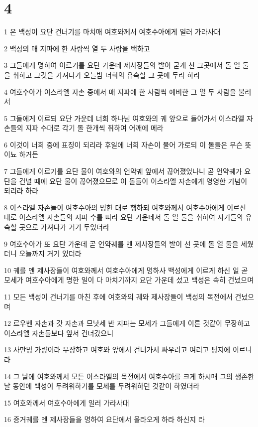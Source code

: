 \chapter{4}

\par 1 온 백성이 요단 건너기를 마치매 여호와께서 여호수아에게 일러 가라사대
\par 2 백성의 매 지파에 한 사람씩 열 두 사람을 택하고
\par 3 그들에게 명하여 이르기를 요단 가운데 제사장들의 발이 굳게 선 그곳에서 돌 열 둘을 취하고 그것을 가져다가 오늘밤 너희의 유숙할 그 곳에 두라 하라
\par 4 여호수아가 이스라엘 자손 중에서 매 지파에 한 사람씩 예비한 그 열 두 사람을 불러서
\par 5 그들에게 이르되 요단 가운데 너희 하나님 여호와의 궤 앞으로 들어가서 이스라엘 자손들의 지파 수대로 각기 돌 한개씩 취하여 어깨에 메라
\par 6 이것이 너희 중에 표징이 되리라 후일에 너희 자손이 물어 가로되 이 돌들은 무슨 뜻이뇨 하거든
\par 7 그들에게 이르기를 요단 물이 여호와의 언약궤 앞에서 끊어졌었나니 곧 언약궤가 요단을 건널 때에 요단 물이 끊어졌으므로 이 돌들이 이스라엘 자손에게 영영한 기념이 되리라 하라
\par 8 이스라엘 자손들이 여호수아의 명한 대로 행하되 여호와께서 여호수아에게 이르신 대로 이스라엘 자손들의 지파 수를 따라 요단 가운데서 돌 열 둘을 취하여 자기들의 유숙할 곳으로 가져다가 거기 두었더라
\par 9 여호수아가 또 요단 가운데 곧 언약궤를 멘 제사장들의 발이 선 곳에 돌 열 둘을 세웠더니 오늘까지 거기 있더라
\par 10 궤를 멘 제사장들이 여호와께서 여호수아에게 명하사 백성에게 이르게 하신 일 곧 모세가 여호수아에게 명한 일이 다 마치기까지 요단 가운데 섰고 백성은 속히 건넜으며
\par 11 모든 백성이 건너기를 마친 후에 여호와의 궤와 제사장들이 백성의 목전에서 건넜으며
\par 12 르우벤 자손과 갓 자손과 므낫세 반 지파는 모세가 그들에게 이른 것같이 무장하고 이스라엘 자손들보다 앞서 건너갔으니
\par 13 사만명 가량이라 무장하고 여호와 앞에서 건너가서 싸우려고 여리고 평지에 이르니라
\par 14 그 날에 여호와께서 모든 이스라엘의 목전에서 여호수아를 크게 하시매 그의 생존한 날 동안에 백성이 두려워하기를 모세를 두려워하던 것같이 하였더라
\par 15 여호와께서 여호수아에게 일러 가라사대
\par 16 증거궤를 멘 제사장들을 명하여 요단에서 올라오게 하라 하신지 라
